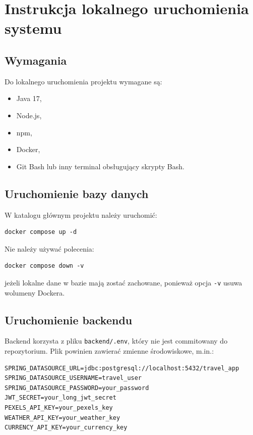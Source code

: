 \documentclass[12pt,a4paper]{article}
\begin{document}
\section{Instrukcja lokalnego uruchomienia systemu}

\subsection{Wymagania}

Do lokalnego uruchomienia projektu wymagane są:
\begin{itemize}
\item Java 17,
\item Node.js,
\item npm,
\item Docker,
\item Git Bash lub inny terminal obsługujący skrypty Bash.
\end{itemize}

\subsection{Uruchomienie bazy danych}

W katalogu głównym projektu należy uruchomić:

\begin{verbatim}
docker compose up -d
\end{verbatim}

Nie należy używać polecenia:

\begin{verbatim}
docker compose down -v
\end{verbatim}

jeżeli lokalne dane w bazie mają zostać zachowane, ponieważ opcja \texttt{-v} usuwa wolumeny Dockera.

\subsection{Uruchomienie backendu}

Backend korzysta z pliku \texttt{backend/.env}, który nie jest commitowany do repozytorium. Plik powinien zawierać zmienne środowiskowe, m.in.:

\begin{verbatim}
SPRING_DATASOURCE_URL=jdbc:postgresql://localhost:5432/travel_app
SPRING_DATASOURCE_USERNAME=travel_user
SPRING_DATASOURCE_PASSWORD=your_password
JWT_SECRET=your_long_jwt_secret
PEXELS_API_KEY=your_pexels_key
WEATHER_API_KEY=your_weather_key
CURRENCY_API_KEY=your_currency_key
\end{verbatim}
\end{document}
